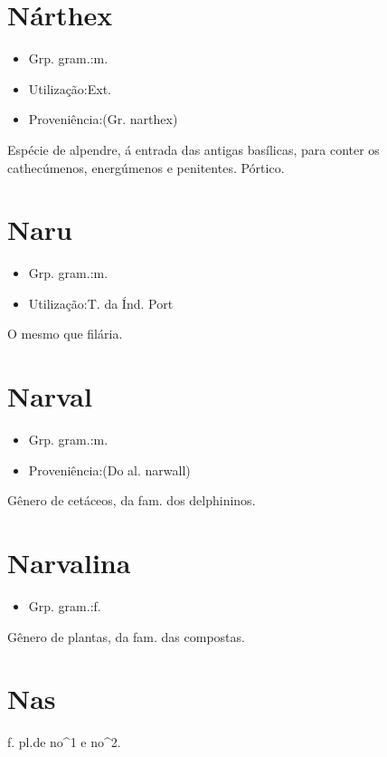 \section{Nárthex}
\begin{itemize}
\item {Grp. gram.:m.}
\end{itemize}
\begin{itemize}
\item {Utilização:Ext.}
\end{itemize}
\begin{itemize}
\item {Proveniência:(Gr. \textunderscore narthex\textunderscore )}
\end{itemize}
Espécie de alpendre, á entrada das antigas basílicas, para conter os cathecúmenos, energúmenos e penitentes.
Pórtico.
\section{Naru}
\begin{itemize}
\item {Grp. gram.:m.}
\end{itemize}
\begin{itemize}
\item {Utilização:T. da Índ. Port}
\end{itemize}
O mesmo que \textunderscore filária\textunderscore .
\section{Narval}
\begin{itemize}
\item {Grp. gram.:m.}
\end{itemize}
\begin{itemize}
\item {Proveniência:(Do al. \textunderscore narwall\textunderscore )}
\end{itemize}
Gênero de cetáceos, da fam. dos delphininos.
\section{Narvalina}
\begin{itemize}
\item {Grp. gram.:f.}
\end{itemize}
Gênero de plantas, da fam. das compostas.
\section{Nas}
\textunderscore f. pl.\textunderscore  de \textunderscore no\textunderscore ^1 e \textunderscore no\textunderscore ^2.

